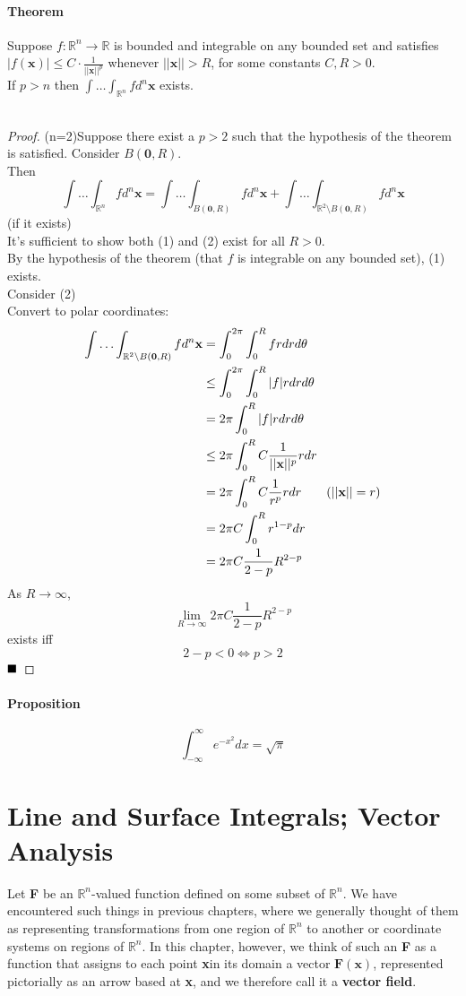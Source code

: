 \documentclass[11pt]{article}
\newcommand{\tb}[1]{\textbf{#1}}
\newcommand{\real}[0]{\mathbb{R}}
\newcommand{\vx}[0]{\tb{x}}
\newcommand{\vo}[0]{\tb{0}}
\newcommand{\qed}[0]{$\hfill\blacksquare$}
\begin{document}
\paragraph{Theorem} Suppose $f:\real^n \rightarrow \real$ is bounded and integrable on any bounded set and satisfies $|f(\vx)| \leq C \cdot \frac{1}{||\vx||^p}$ whenever $||\vx|| > R$, for some constants $C,R > 0$.\\
If $p>n$ then $\int\hdots \int_{\real^n}fd^n\vx$ exists.\\\\
\begin{proof}
(n=2)Suppose there exist a $p > 2$ such that the hypothesis of the theorem is satisfied. Consider $B(\vo,R)$.\\
Then $$\int\hdots \int_{\real^n}fd^n\vx = \int\hdots \int_{B(\vo,R)}fd^n\vx + \int\hdots \int_{\real^2 \setminus B(\vo, R)}fd^n\vx$$
(if it exists)\\
It's sufficient to show both (1) and (2) exist for all $R>0$.\\
By the hypothesis of the theorem (that $f$ is integrable on any bounded set), (1) exists.\\
Consider (2)\\
Convert to polar coordinates:
\begin{align*}
	\int\hdots \int_{\real^2 \setminus B(\vo, R)}fd^n\vx &= \int_0^{2\pi}\int_0^Rfrdrd\theta\\
	&\leq \int_0^{2\pi}\int_0^R|f|rdrd\theta\\
	&= 2\pi \int_0^R|f|rdrd\theta\\
	&\leq 2\pi \int_0^R C \frac{1}{||\vx||^p}rdr\\
	&= 2\pi \int_0^R C \frac{1}{r^p}rdr \tag{$||\vx|| = r$}\\
	&= 2\pi C\int_0^R r^{1-p}dr\\
	&= 2\pi C\frac{1}{2-p}R^{2-p}
\end{align*}
As $R \rightarrow \infty$, $$\underset{R\rightarrow\infty}{\lim}2\pi C\frac{1}{2-p}R^{2-p}$$ exists iff $$2-p<0 \iff p>2$$ \qed
\end{proof}

\paragraph{Proposition} $$\int_{-\infty}^\infty e^{-x^2}dx = \sqrt{\pi}$$
\section{Line and Surface Integrals; Vector Analysis}
Let \tb{F} be an $\real^n$-valued function defined on some subset of $\real^n$. We have encountered such things in previous chapters, where we generally thought of them as representing transformations from one region of $\real^n$ to another or coordinate systems on regions of $\real^n$. In this chapter, however, we think of such an \tb{F} as a function that assigns to each point \vx in its domain a vector $\tb{F}(\vx)$, represented pictorially as an arrow based at \vx, and we therefore call it a \tb{vector field}.
\end{document}
